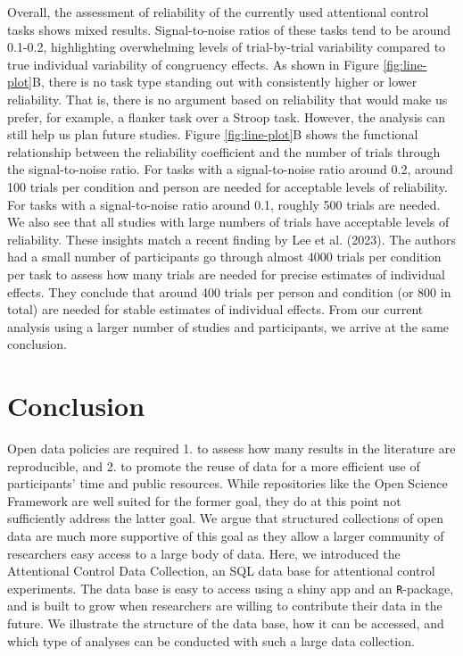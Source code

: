 \documentclass[
  man,floatsintext]{apa6}
\begin{document}
Overall, the assessment of reliability of the currently used attentional control tasks shows mixed results. Signal-to-noise ratios of these tasks tend to be around 0.1-0.2, highlighting overwhelming levels of trial-by-trial variability compared to true individual variability of congruency effects. As shown in Figure \ref{fig:line-plot}B, there is no task type standing out with consistently higher or lower reliability. That is, there is no argument based on reliability that would make us prefer, for example, a flanker task over a Stroop task. However, the analysis can still help us plan future studies. Figure \ref{fig:line-plot}B shows the functional relationship between the reliability coefficient and the number of trials through the signal-to-noise ratio. For tasks with a signal-to-noise ratio around 0.2, around 100 trials per condition and person are needed for acceptable levels of reliability. For tasks with a signal-to-noise ratio around 0.1, roughly 500 trials are needed. We also see that all studies with large numbers of trials have acceptable levels of reliability. These insights match a recent finding by Lee et al. (2023). The authors had a small number of participants go through almost 4000 trials per condition per task to assess how many trials are needed for precise estimates of individual effects. They conclude that around 400 trials per person and condition (or 800 in total) are needed for stable estimates of individual effects. From our current analysis using a larger number of studies and participants, we arrive at the same conclusion.

\hypertarget{conclusion}{%
\section{Conclusion}\label{conclusion}}

Open data policies are required 1. to assess how many results in the literature are reproducible, and 2. to promote the reuse of data for a more efficient use of participants' time and public resources. While repositories like the Open Science Framework are well suited for the former goal, they do at this point not sufficiently address the latter goal. We argue that structured collections of open data are much more supportive of this goal as they allow a larger community of researchers easy access to a large body of data. Here, we introduced the Attentional Control Data Collection, an SQL data base for attentional control experiments. The data base is easy to access using a shiny app and an \texttt{R}-package, and is built to grow when researchers are willing to contribute their data in the future. We illustrate the structure of the data base, how it can be accessed, and which type of analyses can be conducted with such a large data collection.
\end{document}

